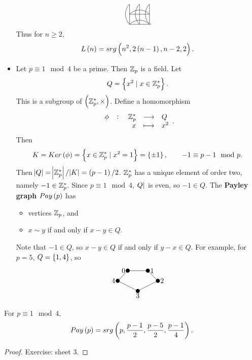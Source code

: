 \begin{example*}
\begin{itemize}
$$\begin{tikzpicture}
\draw (0, 0) to (0, -0.5);
\draw (0.5, 0) to (0.5, -0.5);
\draw (1, 0) to (1, -0.5);
\draw (0, -0.5) to (0.5, -0.5);
\draw (0.5, -0.5) to (1, -0.5);
\draw (0, -0.5) to [bend left=45] (1, -0.5);
\draw (0, -0.5) to (0, -1);
\draw (0.5, -0.5) to (0.5, -1);
\draw (1, -0.5) to (1, -1);
\draw (0, -1) to (0.5, -1);
\draw (0.5, -1) to (1, -1);
\draw (0, -1) to [bend left=45] (1, -1);
\draw (0, 0) to [bend right=45] (0, -1);
\draw (0.5, 0) to [bend right=45] (0.5, -1);
\draw (1, 0) to [bend right=45] (1, -1);
\end{tikzpicture}.
$$
Thus for $ n \ge 2 $,
$$ L\br{n} = srg\br{n^2, 2\br{n - 1}, n - 2, 2}. $$
\item Let $ p \equiv 1 \mod 4 $ be a prime. Then $ \mathbb{Z}_p $ is a field. Let
$$ Q = \cbr{x^2 \mid x \in \Z_p^*}. $$
This is a subgroup of $ \br{\Z_p^*, \times} $. Define a homomorphism
$$ \function[\phi]{\Z_p^*}{Q}{x}{x^2}. $$
Then
$$ K = Ker\br{\phi} = \cbr{x \in \Z_p^* \mid x^2 = 1} = \cbr{\pm 1}, \qquad -1 \equiv p - 1 \mod p. $$
Then $ \abs{Q} = \abs{\Z_p^*} / \abs{K} = \br{p - 1} / 2 $. $ \mathbb{Z}_p^* $ has a unique element of order two, namely $ -1 \in \mathbb{Z}_p^* $. Since $ p \equiv 1 \mod 4 $, $ \abs{Q} $ is even, so $ -1 \in Q $. The \textbf{Payley graph} $ Pay\br{p} $ has
\begin{itemize}
\item vertices $ \mathbb{Z}_p $, and
\item $ x \sim y $ if and only if $ x - y \in Q $.
\end{itemize}
Note that $ -1 \in Q $, so $ x - y \in Q $ if and only if $ y - x \in Q $. For example, for $ p = 5 $, $ Q = \cbr{1, 4} $, so
$$
\begin{tikzpicture}
\fill (0, 0) circle (0.1) node[left]{$ 0 $};
\fill (1, 0) circle (0.1) node[right]{$ 1 $};
\fill (-0.5, -0.5) circle (0.1) node[left]{$ 4 $};
\fill (1.5, -0.5) circle (0.1) node[right]{$ 2 $};
\fill (0.5, -1) circle (0.1) node[below]{$ 3 $};
\draw (0, 0) to (1, 0);
\draw (0, 0) to (-0.5, -0.5);
\draw (1, 0) to (1.5, -0.5);
\draw (-0.5, -0.5) to (0.5, -1);
\draw (1.5, -0.5) to (0.5, -1);
\end{tikzpicture}
$$
\end{itemize}
\end{example*}

\begin{proposition}
For $ p \equiv 1 \mod 4 $,
$$ Pay\br{p} = srg\br{p, \dfrac{p - 1}{2}, \dfrac{p - 5}{2}, \dfrac{p - 1}{4}}. $$
\end{proposition}

\begin{proof}
Exercise: sheet $ 3 $.
\end{proof}

